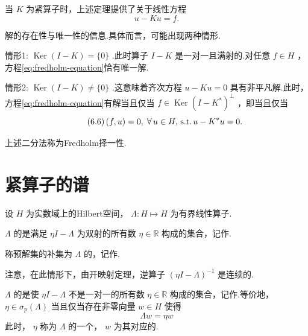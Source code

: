 \begin{note}[Fredholm择一性]\label{rem:fredholm-alternative}
当 $K$ 为紧算子时，上述定理提供了关于线性方程
\begin{equation}\tag{6.5}\label{eq:fredholm-equation}
u - {Ku} = f.
\end{equation}

解的存在性与唯一性的信息.具体而言，可能出现两种情形.

情形1: $\operatorname{Ker}\left( {I - K}\right)  = \{ 0\}$ .此时算子 $I - K$ 是一对一且满射的.对任意 $f \in  H$ ，方程\eqref{eq:fredholm-equation}恰有唯一解.

情形2: $\operatorname{Ker}\left( {I - K}\right)  \neq  \{ 0\}$ .这意味着齐次方程 $u - {Ku} = 0$ 具有非平凡解.此时，方程\eqref{eq:fredholm-equation}有解当且仅当 $f \in  \operatorname{Ker}{\left( I - {K}^{ * }\right) }^{ \bot  }$ ，即当且仅当
\begin{equation}\tag{6.6}\label{eq:fredholm-solvability-condition}
\left( {f,u}\right)  = 0,\;\forall\,u \in  H,\operatorname{\,\text{s.t.}} u - {K}^{ * }u = 0.
\end{equation}

上述二分法称为Fredholm择一性.
\end{note}

\section{紧算子的谱}

设 $H$ 为实数域上的Hilbert空间， $\Lambda  : H \mapsto  H$ 为有界线性算子.
\begin{definition}[预解集、谱]
    $\Lambda$ 的是满足 ${\eta I} - \Lambda$ 为双射的所有数 $\eta  \in  \mathbb{R}$ 构成的集合，记作.\par
    称预解集的补集为 $\Lambda$ 的，记作.
\end{definition}
注意，在此情形下，由开映射定理，逆算子 ${\left( \eta I - \Lambda \right) }^{-1}$ 是连续的.
\begin{definition}[点谱]
    $\Lambda$ 的是使 ${\eta I} - \Lambda$ 不是一对一的所有数 $\eta  \in  \mathbb{R}$ 构成的集合，记作.等价地， $\eta  \in  {\sigma }_{p}\left( \Lambda \right)$ 当且仅当存在非零向量 $w \in  H$ 使得\[
{\Lambda w} = {\eta w}
\]
此时， $\eta$ 称为 $\Lambda$ 的一个， $w$ 为其对应的.\par
\end{definition}

